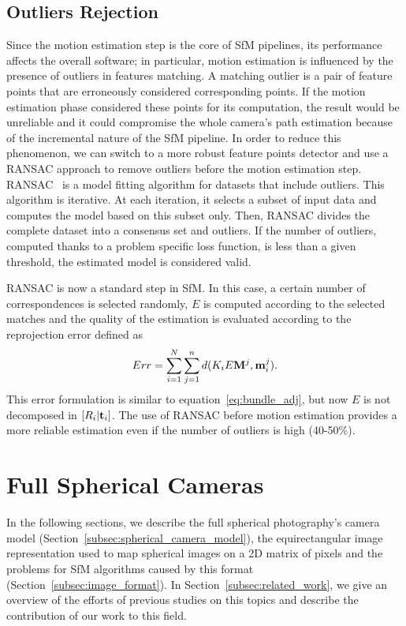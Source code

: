 \subsection{Outliers Rejection}
Since the motion estimation step is the core of SfM pipelines, its performance
affects the overall software; in particular, motion estimation is influenced 
by the presence of outliers in features matching.
A matching outlier is a pair of feature points that are erroneously considered 
corresponding points. If the motion estimation phase considered these points for
its computation, the result would be unreliable and it could compromise the 
whole camera's path estimation because of the incremental nature of the SfM 
pipeline.
In order to reduce this phenomenon, we can switch to a more robust feature points
detector and use a RANSAC approach to remove outliers before the motion estimation step.
RANSAC~\cite{fischler1981random} is a model fitting algorithm for datasets that include outliers.
This algorithm is iterative. At each iteration, it selects a subset of input data and computes the model based on this subset only. Then, RANSAC divides the complete dataset into a consensus set and outliers. If the number of outliers, computed thanks to a problem specific loss function, is
less than a given threshold, the estimated model is considered valid.

RANSAC is now a standard step in SfM. In this case, a certain number of correspondences is selected randomly, $E$ is computed 
according to the selected matches and the quality of the estimation is evaluated 
according to the reprojection error defined as
%
\begin{equation*}
	Err =  
	\sum_{i = 1}^N\sum_{j = 1}^n 
	d(K_iE\mathbf{M}^j, \mathbf{m}_i^j) \text{.}
\end{equation*}
%
This error formulation is similar to equation~\ref{eq:bundle_adj}, 
but now $E$ is not decomposed in $[R_i|\mathbf{t}_i]$. The use of RANSAC before motion estimation provides a more reliable 
estimation even if the number of outliers is high (40-50\%).

\section{Full Spherical Cameras}
In the following sections, we describe the full spherical photography's camera
model (Section~\ref{subsec:spherical_camera_model}), the equirectangular image 
representation used to map spherical images on a 2D matrix of pixels 
and the problems for SfM algorithms caused by this format 
(Section~\ref{subsec:image_format}).
In Section~\ref{subsec:related_work}, we give an overview of the efforts of 
previous studies on this topics and describe the contribution of our work to 
this field.

